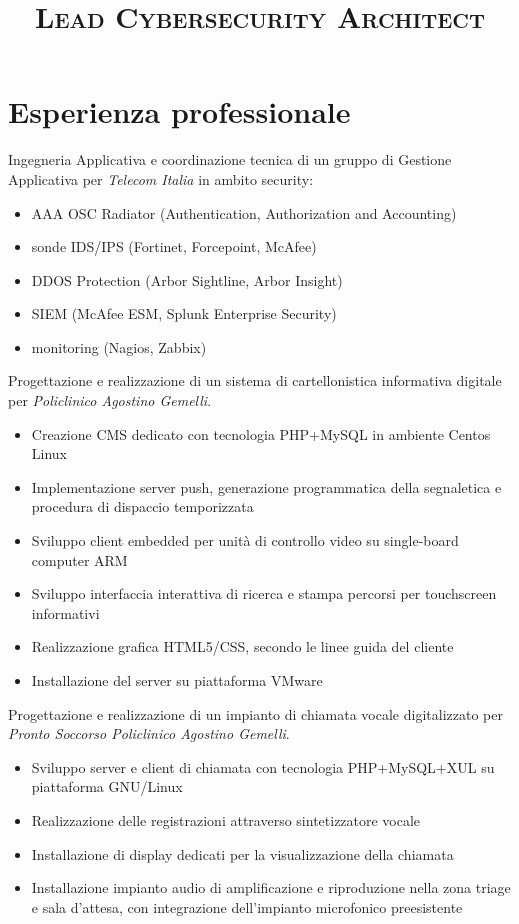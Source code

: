 \documentclass[a4paper, 11pt]{moderncv}
\title{\Large{\textsc{Lead Cybersecurity \break Architect}}}
\begin{document}
\makecvtitle

\section{Esperienza professionale}
        {Ingegneria Applicativa e coordinazione tecnica di un gruppo di Gestione Applicativa per \emph{Telecom Italia} in ambito security:
          \begin{itemize}
          \item AAA OSC Radiator (Authentication, Authorization and Accounting)
          \item sonde IDS/IPS (Fortinet, Forcepoint, McAfee)
          \item DDOS Protection (Arbor Sightline, Arbor Insight)
          \item SIEM (McAfee ESM, Splunk Enterprise Security)
          \item monitoring (Nagios, Zabbix)
          \end{itemize}}
        {Progettazione e realizzazione di un sistema di cartellonistica informativa digitale per \emph{Policlinico Agostino Gemelli}.
          \begin{itemize}
          \item Creazione CMS dedicato con tecnologia PHP+MySQL in ambiente Centos Linux
          \item Implementazione server push, generazione programmatica della segnaletica e procedura di dispaccio temporizzata
          \item Sviluppo client embedded per unità di controllo video su single-board computer ARM
          \item Sviluppo interfaccia interattiva di ricerca e stampa percorsi per touchscreen informativi
          \item Realizzazione grafica HTML5/CSS, secondo le linee guida del cliente
          \item Installazione del server su piattaforma VMware
          \end{itemize}
        \vspace{10pt}
          Progettazione e realizzazione di un impianto di chiamata vocale digitalizzato per \emph{Pronto Soccorso Policlinico Agostino Gemelli}.
          \begin{itemize}
          \item Sviluppo server e client di chiamata con tecnologia PHP+MySQL+XUL su piattaforma GNU/Linux
          \item Realizzazione delle registrazioni attraverso sintetizzatore vocale
          \item Installazione di display dedicati per la visualizzazione della chiamata
          \item Installazione impianto audio di amplificazione e riproduzione nella zona triage e sala d'attesa, con integrazione dell'impianto microfonico preesistente
          \end{itemize}}
\end{document}
